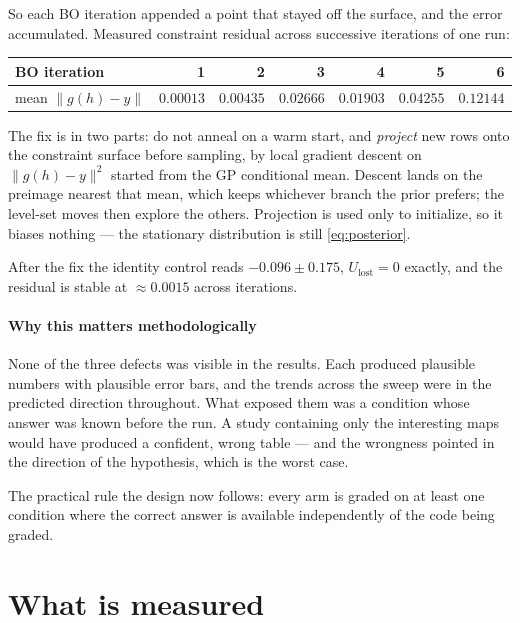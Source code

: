 \documentclass[11pt]{article}
\newcommand{\Ulost}{U_{\text{lost}}}
\begin{document}
So each BO iteration appended a point that stayed off the surface, and the error
accumulated. Measured constraint residual across successive iterations of one
run:
\begin{center}
\begin{tabular}{lrrrrrr}
\toprule
BO iteration & 1 & 2 & 3 & 4 & 5 & 6 \\
\midrule
mean $\|g(h)-y\|$ & $0.00013$ & $0.00435$ & $0.02666$ & $0.01903$ & $0.04255$ & $0.12144$ \\
\bottomrule
\end{tabular}
\end{center}

The fix is in two parts: do not anneal on a warm start, and \emph{project} new
rows onto the constraint surface before sampling, by local gradient descent on
$\|g(h)-y\|^2$ started from the GP conditional mean. Descent lands on the
preimage nearest that mean, which keeps whichever branch the prior prefers; the
level-set moves then explore the others. Projection is used only to initialize,
so it biases nothing --- the stationary distribution is still
\eqref{eq:posterior}.

After the fix the identity control reads $-0.096\pm0.175$, $\Ulost=0$ exactly,
and the residual is stable at $\approx0.0015$ across iterations.

\subsection{Why this matters methodologically}

None of the three defects was visible in the results. Each produced plausible
numbers with plausible error bars, and the trends across the sweep were in the
predicted direction throughout. What exposed them was a condition whose answer
was known before the run. A study containing only the interesting maps would have
produced a confident, wrong table --- and the wrongness pointed in the direction
of the hypothesis, which is the worst case.

The practical rule the design now follows: every arm is graded on at least one
condition where the correct answer is available independently of the code being
graded.

\part{What is measured}
\label{part:measure}
\end{document}
